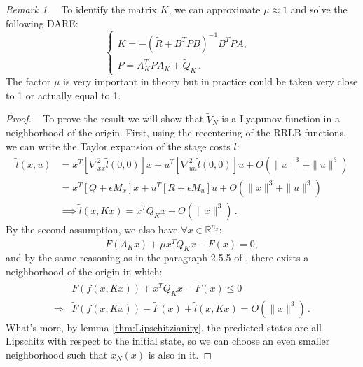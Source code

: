 \documentclass[conference]{IEEEtran}
\theoremstyle{definition}
\theoremstyle{remark}
\newtheorem*{remark}{Remark}
\newcommand{\R}{\mathbb{R}}
\begin{document}
\begin{remark}~
	To identify the matrix $K$, we can approximate $\mu\approx 1$ and solve the following DARE:
	\begin{equation}
		\label{eq:modified-DARE}
		\begin{cases}
			K=-(\tilde{R}+B^TP B)^{-1}B^TP A,&\\
			P=A_K^TP A_K+\tilde{Q}_K\,.
		\end{cases}
	\end{equation}
	The factor $\mu$ is very important in theory but in practice could be taken very close to 1 or actually equal to 1.
\end{remark}

\begin{proof}~
	To prove the result we will show that $\tilde{V}_N$ is a Lyapunov function in a neighborhood of the origin.
	First, using the recentering of the RRLB functions, we can write the Taylor expansion of the stage costs $\tilde{l}$:
	\begin{align*}
		\tilde{l}(x,u)&=x^T[\nabla_{xx}^2\tilde{l}(0,0)] x+u^T[\nabla_{uu}^2\tilde{l}(0,0)]u+O(\|x\|^3+\|u\|^3)\\
		&=x^T[Q+\epsilon M_x]x+u^T[R+\epsilon M_u]u+O(\|x\|^3+\|u\|^3)\\
		&\implies\tilde{l}(x,Kx)=x^TQ_Kx+O(\|x\|^3)\,.
	\end{align*}
	By the second assumption, we also have $\forall x\in\R^{n_x}$:
	\begin{equation}
		\tilde{F}(A_Kx)+\mu x^T Q_K x-\tilde{F}(x)=0,
	\end{equation}
	and by the same reasoning as in the paragraph 2.5.5 of \cite{MPC-book}, there exists a neighborhood of the origin in which:
	\begin{align}
		&\tilde{F}(f(x,Kx))+x^T Q_K x-\tilde{F}(x)\leq 0\\
		\Longrightarrow&\tilde{F}(f(x,Kx))-\tilde{F}(x)+\tilde{l}(x,Kx)=O(\|x\|^3)\,.
	\end{align}
	What's more, by lemma \ref{thm:Lipschitzianity}, the predicted states are all Lipschitz with respect to the initial state, so we can choose an even smaller neighborhood such that $\tilde{x}_N(x)$ is also in it.


\end{proof}
\end{document}
